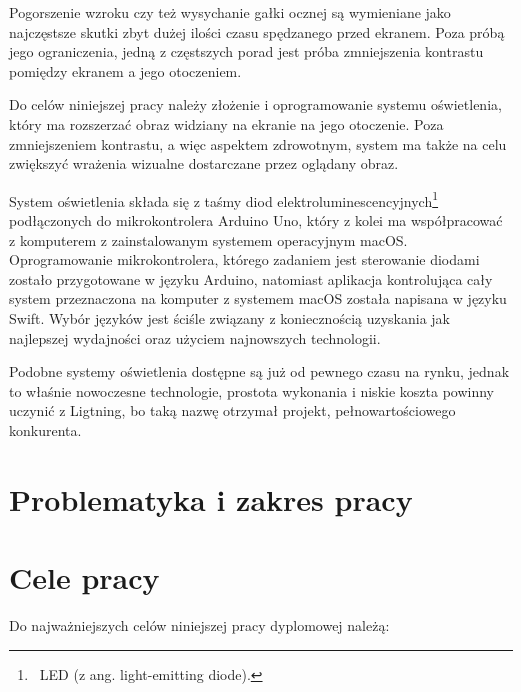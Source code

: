 \documentclass[12pt]{report}
\begin{document}
Pogorszenie wzroku czy też wysychanie gałki ocznej są wymieniane jako naj\-częstsze skutki zbyt dużej ilości czasu spędzanego przed ekranem. Poza próbą jego ograniczenia, jedną z częstszych porad jest próba zmniejszenia kontrastu pomiędzy ekranem a jego otoczeniem.

Do celów niniejszej pracy należy złożenie i oprogramowanie systemu oświetlenia, który ma rozszerzać obraz widziany na ekranie na jego otoczenie. Poza zmniejszeniem kontrastu, a więc aspektem zdrowotnym, system ma także na celu zwiększyć wrażenia wizualne dostarczane przez oglądany obraz.

System oświetlenia składa się z taśmy diod elektroluminescencyjnych\footnote{~LED (z ang. light-emitting diode).} pod\-łączonych do mikrokontrolera Arduino Uno, który z kolei ma współpracować z komputerem z zainstalowanym systemem operacyjnym macOS. Oprogramowanie mikrokontrolera, którego zadaniem jest sterowanie diodami zostało przygotowane w języku Arduino, natomiast aplikacja kontrolująca cały system przeznaczona na komputer z systemem macOS została napisana w języku Swift. Wybór języków jest ściśle związany z koniecznością uzyskania jak najlepszej wydajności oraz użyciem najnowszych technologii.

Podobne systemy oświetlenia dostępne są już od pewnego czasu na rynku, jednak to właśnie nowoczesne technologie, prostota wykonania i niskie koszta powinny uczynić z Ligtning, bo taką nazwę otrzymał projekt, pełnowartościowego konkurenta.

\section{Problematyka i zakres pracy}


\section{Cele pracy}

Do najważniejszych celów niniejszej pracy dyplomowej należą:
\end{document}
